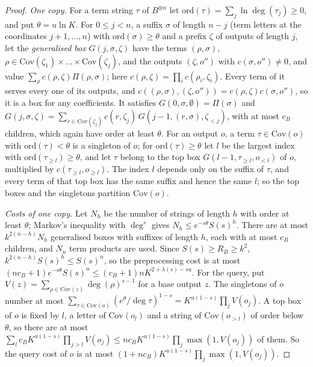 \documentclass[11pt]{article}
\theoremstyle{definition}
\theoremstyle{remark}
\newcommand{\Cov}{\mathrm{Cov}}               %
\newcommand{\cB}{c_B}                         %
\newcommand{\RB}{R_B}                         %
\begin{document}
\begin{proof}
\emph{One copy.} For a term string $\tau$ of $B^{\otimes n}$ let $\mathrm{ord}(\tau)=\sum_j\ln\deg(\tau_j)\ge0$, and put $\theta=u\ln K$. For $0\le j<n$, a suffix $\sigma$ of length $n-j$ (term letters at the coordinates $j+1,\dots,n$) with $\mathrm{ord}(\sigma)\ge\theta$ and a prefix $\zeta$ of outputs of length $j$, let the \emph{generalised box} $G(j,\sigma,\zeta)$ have the terms $(\rho,\sigma)$, $\rho\in\Cov(\zeta_1)\times\dots\times\Cov(\zeta_j)$, and the outputs $(\zeta,o'')$ with $c(\sigma,o'')\ne0$, and value $\sum_\rho c(\rho,\zeta)\Pi(\rho,\sigma)$; here $c(\rho,\zeta)=\prod_ic(\rho_i,\zeta_i)$. Every term of it serves every one of its outputs, and $c((\rho,\sigma),(\zeta,o''))=c(\rho,\zeta)c(\sigma,o'')$, so it is a box for any coefficients. It satisfies $G(0,\sigma,\emptyset)=\Pi(\sigma)$ and $G(j,\sigma,\zeta)=\sum_{r\in\Cov(\zeta_j)}c(r,\zeta_j)\,G(j-1,(r,\sigma),\zeta_{<j})$, with at most $\cB$ children, which again have order at least $\theta$. For an output $o$, a term $\tau\in\Cov(o)$ with $\mathrm{ord}(\tau)<\theta$ is a singleton of $o$; for $\mathrm{ord}(\tau)\ge\theta$ let $l$ be the largest index with $\mathrm{ord}(\tau_{\ge l})\ge\theta$, and let $\tau$ belong to the top box $G(l-1,\tau_{\ge l},o_{<l})$ of $o$, multiplied by $c(\tau_{\ge l},o_{\ge l})$. The index $l$ depends only on the suffix of $\tau$, and every term of that top box has the same suffix and hence the same $l$; so the top boxes and the singletons partition $\Cov(o)$.

\emph{Costs of one copy.} Let $N_h$ be the number of strings of length $h$ with order at least $\theta$; Markov's inequality with $\deg^s$ gives $N_h\le e^{-s\theta}S(s)^h$. There are at most $k^{2(n-h)}N_h$ generalised boxes with suffixes of length $h$, each with at most $\cB$ children, and $N_n$ term products are used. Since $S(s)\ge\RB\ge k^2$, $k^{2(n-h)}S(s)^h\le S(s)^n$, so the preprocessing cost is at most $(n\cB+1)e^{-s\theta}S(s)^n\le(\cB+1)nK^{2+\lambda(s)-su}$. For the query, put $V(z)=\sum_{\rho\in\Cov(z)}\deg(\rho)^{s-1}$ for a base output $z$. The singletons of $o$ number at most $\sum_{\tau\in\Cov(o)}(e^\theta/\deg\tau)^{1-s}=K^{u(1-s)}\prod_jV(o_j)$. A top box of $o$ is fixed by $l$, a letter of $\Cov(o_l)$ and a string of $\Cov(o_{>l})$ of order below $\theta$, so there are at most $\sum_l\cB K^{u(1-s)}\prod_{j>l}V(o_j)\le n\cB K^{u(1-s)}\prod_j\max(1,V(o_j))$ of them. So the query cost of $o$ is at most $(1+n\cB)K^{u(1-s)}\prod_j\max(1,V(o_j))$.


\end{proof}
\end{document}
